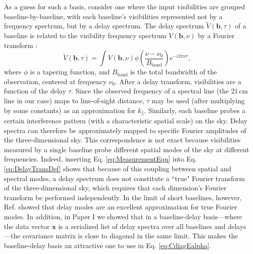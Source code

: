 \documentclass[twocolumn,aps,prd,nofootinbib,showpacs]{revtex4-1}
\begin{document}
As a guess for such a basis, consider one where the input visibilities are grouped baseline-by-baseline, with each baseline's visibilities represented not by a frequency spectrum, but by a delay spectrum.  The delay spectrum $\widetilde{V} (\mathbf{b}, \tau)$ of a baseline is related to the visibility frequency spectrum $V(\mathbf{b}, \nu)$ by a Fourier transform \cite{Parsons2012b}:
\begin{equation}
\label{eq:DelayTransDef}
\widetilde{V} (\mathbf{b}, \tau) = \int V(\mathbf{b}, \nu) \phi \left( \frac{\nu-\nu_0}{B_\textrm{band}} \right) e^{-i 2\pi \nu \tau},
\end{equation}
where $\phi$ is a tapering function, and $B_\textrm{band}$ is the total bandwidth of the observation, centered at frequency $\nu_0$.  After a delay transform, visibilities are a function of the delay $\tau$.  Since the observed frequency of a spectral line (the $21\,\textrm{cm}$ line in our case) maps to line-of-sight distance, $\tau$ may be used (after multiplying by some constants) as an approximation for $k_\parallel$.  Similarly, each baseline probes a certain interference pattern (with a characteristic spatial scale) on the sky.  Delay spectra can therefore be approximately mapped to specific Fourier amplitudes of the three-dimensional sky.  This correspondence is not exact because visibilities measured by a single baseline probe different spatial modes of the sky at different frequencies.  Indeed, inserting Eq. \eqref{eq:MeasurementEqn} into Eq. \eqref{eq:DelayTransDef} shows that because of this coupling between spatial and spectral modes, a delay spectrum does not constitute a ``true" Fourier transform of the three-dimensional sky, which requires that each dimension's Fourier transform be performed independently.  In the limit of short baselines, however, Ref. \cite{Parsons2012b} showed that delay modes are an excellent approximation for true Fourier modes.  In addition, in Paper I we showed that in a baseline-delay basis---where the data vector $\mathbf{x}$ is a serialized list of delay spectra over all baselines and delays---the covariance matrix is close to diagonal in the same limit.  This makes the baseline-delay basis an attractive one to use in Eq. \eqref{eq:CdiagEalpha}.
\end{document}
